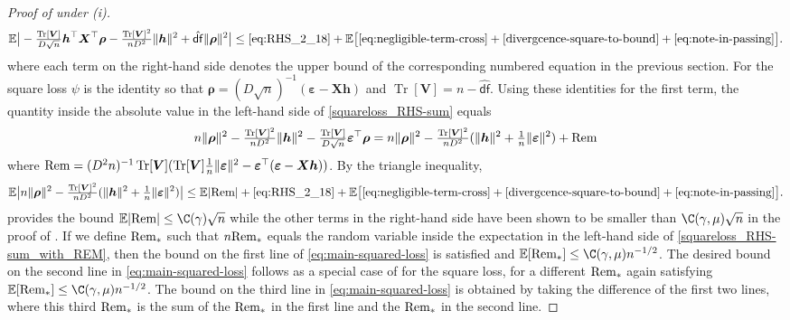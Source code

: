\documentclass[11pt]{amsart}
\numberwithin{equation}{section}
\numberwithin{equation}{section}
\def\E{{\mathbb{E}}}
\def\Rem{\hbox{\rm Rem}}
\DeclareMathOperator{\trace}{Tr}
\def\mathbold{\boldsymbol} %
\def\bh{\mathbold{h}}\def\hhat{\widehat{h}}\def\htil{\widetilde{h}}
\def\bV{\mathbold{V}}\def\hbV{{\widehat{\bV}}}\def\tbV{{\widetilde{\bV}}}
\def\bX{\mathbold{X}}\def\hbX{{\widehat{\bX}}}\def\tbX{{\widetilde{\bX}}}\def\bXbar{{\overline \bX}}
\def\ep{\varepsilon}\def\eps{\epsilon}\def\veps{\varepsilon}
\def\bep{ {\mathbold{\ep} }}
\def\brho{\mathbold{\rho}}\def\rhohat{\widehat{\rho}}\def\hrho{\widehat{\rho}}
\def\df{{\hat{\mathsf{df}}}{}}
\begin{document}
{\begin{proof}[Proof of  under (i)]
    \begin{equation}
        \E\big|
        -\tfrac{\trace[\bV]}{D\sqrt n} \bh^\top\bX^\top\brho
        -\tfrac{\trace[\bV]^2}{nD^2}\|\bh\|^2 + \df \|\brho\|^2
        \big|
        \le
        \eqref{eq:RHS_2_18}
        +
        \E\bigl[
        \eqref{eq:negligible-term-cross}
        +
        \eqref{divergcence-square-to-bound}
        +
        \eqref{eq:note-in-passing}
        \bigr].
        \label{squareloss_RHS-sum}
    \end{equation}
    where each term on the right-hand side denotes the upper bound
    of the corresponding numbered equation in the previous section.
    For the square loss $\psi$ is the identity so that
    $\brho =(D\sqrt n)^{-1}(\bep - \bX\bh)$
    and $\trace[\bV]=n-\df$.
    Using these identities for the first term,
    the quantity inside the absolute value in the left-hand side
    of \eqref{squareloss_RHS-sum} equals
    $$
    n\|\brho\|^2
    -\tfrac{\trace[\bV]^2}{nD^2} \|\bh\|^2
    -  \tfrac{\trace[\bV]}{D\sqrt n}\bep^\top\brho
    =
    n\|\brho\|^2
    -\tfrac{\trace[\bV]^2}{nD^2} (\|\bh\|^2 + \tfrac1n\|\bep\|^2)
    + \Rem
    $$
    where $\Rem= 
    (D^2n)^{-1} \trace[\bV]
    (
    \trace[\bV] \tfrac1n \|\bep\|^2
    - \bep^\top(\bep - \bX\bh)
    )
    $.
    By the triangle inequality,
    \begin{equation}
        \E\big|
        n\|\brho\|^2
        -\tfrac{\trace[\bV]^2}{nD^2}(\|\bh\|^2 +\tfrac1n \|\bep\|^2)
        \big|
        \le
        \E|\Rem|
        +
        \eqref{eq:RHS_2_18}
        +
        \E\bigl[
        \eqref{eq:negligible-term-cross} 
        +
        \eqref{divergcence-square-to-bound}
        +
        \eqref{eq:note-in-passing}
        \bigr].
        \label{squareloss_RHS-sum_with_REM}
    \end{equation}
     provides the bound $\E|\Rem|\le \C(\gamma) \sqrt n$
    while the other terms in the right-hand side have been shown
    to be smaller than $\C(\gamma,\mu)\sqrt n$ in the proof 
    of .
    If we define $\Rem_*$ such that $n\Rem_*$ equals
    the random variable inside the expectation in the left-hand side of
    \eqref{squareloss_RHS-sum_with_REM},
    then the bound on the first line of \eqref{eq:main-squared-loss} is
    satisfied and
    $\E[\Rem_*]\le \C(\gamma,\mu)n^{-1/2}$.
    The desired bound on the second line in \eqref{eq:main-squared-loss}
    follows as a special case of    
    for the square loss, for a different $\Rem_*$ again satisfying
    $\E[\Rem_*]\le \C(\gamma,\mu)n^{-1/2}$.
    The bound on the third line
    in \eqref{eq:main-squared-loss} is obtained by taking the difference
    of the first two lines, where this third $\Rem_*$ is the sum of
    the $\Rem_*$ in the first line and the $\Rem_*$ in the second line.


\end{proof}}
\end{document}
